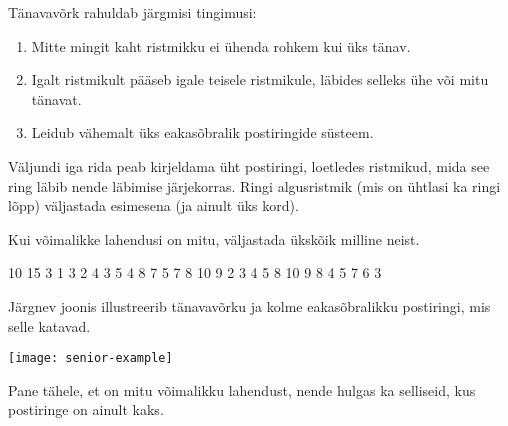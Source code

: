 \documentclass{boi2014-et}
\begin{document}
    Tänavavõrk rahuldab järgmisi tingimusi:
    \begin{enumerate}
        \item Mitte mingit kaht ristmikku ei ühenda rohkem kui üks tänav.
        \item Igalt ristmikult pääseb igale teisele ristmikule,
            läbides selleks ühe või mitu tänavat.
        \item Leidub vähemalt üks eakasõbralik postiringide süsteem.
    \end{enumerate}

    \Output

    Väljundi iga rida peab kirjeldama üht postiringi, loetledes ristmikud,
    mida see ring läbib nende läbimise järjekorras. Ringi algusristmik (mis
    on ühtlasi ka ringi lõpp) väljastada esimesena (ja ainult üks kord).

    Kui võimalikke lahendusi on mitu, väljastada ükskõik milline neist.

    \Example

    \example
    {
        10 15  3  1 3  2 4  3 5  4 8  7  5 7  8  10  9
    }
    {
        2 3 4 5 8 10 9  8 4  5 7 6 3
    }
    {
        Järgnev joonis illustreerib tänavavõrku ja kolme eakasõbralikku
        postiringi, mis selle katavad.

        \texttt{[image: senior-example]}

        Pane tähele, et on mitu võimalikku lahendust, nende hulgas ka
        selliseid, kus postiringe on ainult kaks.
    }
\end{document}
